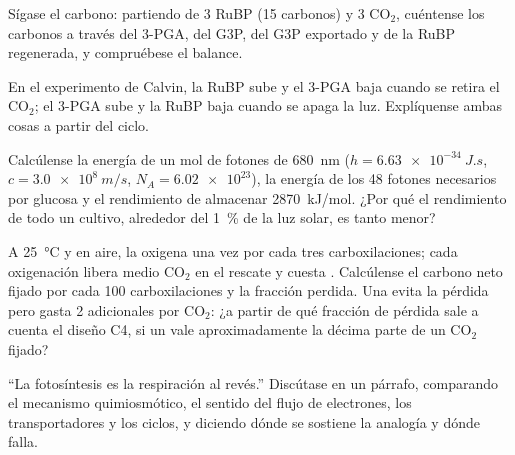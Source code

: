 \begin{exercise}[$\star\star$]\label{exo:b1:photosynthesis:8}
Sígase el carbono: partiendo de 3 RuBP (15 carbonos) y 3 $\mathrm{CO_2}$,
cuéntense los carbonos a través del 3-PGA, del G3P, del G3P exportado y de
la RuBP regenerada, y compruébese el balance.
\end{exercise}

\begin{exercise}[$\star\star$]\label{exo:b1:photosynthesis:9}
En el experimento de Calvin, la RuBP sube y el 3-PGA baja cuando se retira
el $\mathrm{CO_2}$; el 3-PGA sube y la RuBP baja cuando se apaga la luz.
Explíquense ambas cosas a partir del ciclo.
\end{exercise}

\begin{exercise}[$\star\star\star$]\label{exo:b1:photosynthesis:10}
Calcúlense la energía de un mol de fotones de \qty{680}{nm}
($h =
\qty{6.63e-34}{J.s}$, $c = \qty{3.0e8}{m/s}$, $N_A = \num{6.02e23}$),
la energía de los 48 fotones necesarios por glucosa y el rendimiento de
almacenar \qty{2870}{kJ/mol}. ¿Por qué el rendimiento de todo un cultivo,
alrededor del \qty{1}{\%} de la luz solar, es tanto menor?
\end{exercise}

\begin{exercise}[$\star\star\star$]\label{exo:b1:photosynthesis:11}
A \qty{25}{\celsius} y en aire, la  oxigena una vez por cada tres
carboxilaciones; cada oxigenación libera medio $\mathrm{CO_2}$ en el rescate
y cuesta . Calcúlense el carbono neto fijado por cada 100
carboxilaciones y la fracción perdida. Una  evita la pérdida pero
gasta 2  adicionales por $\mathrm{CO_2}$: ¿a partir de qué fracción de
pérdida sale a cuenta el diseño C4, si un  vale aproximadamente la décima
parte de un $\mathrm{CO_2}$ fijado?
\end{exercise}

\begin{exercise}[$\star\star\star$]\label{exo:b1:photosynthesis:12}
``La fotosíntesis es la respiración al revés.'' Discútase en un párrafo,
comparando el mecanismo quimiosmótico, el sentido del flujo de electrones,
los transportadores y los ciclos, y diciendo dónde se sostiene la analogía y
dónde falla.
\end{exercise}

